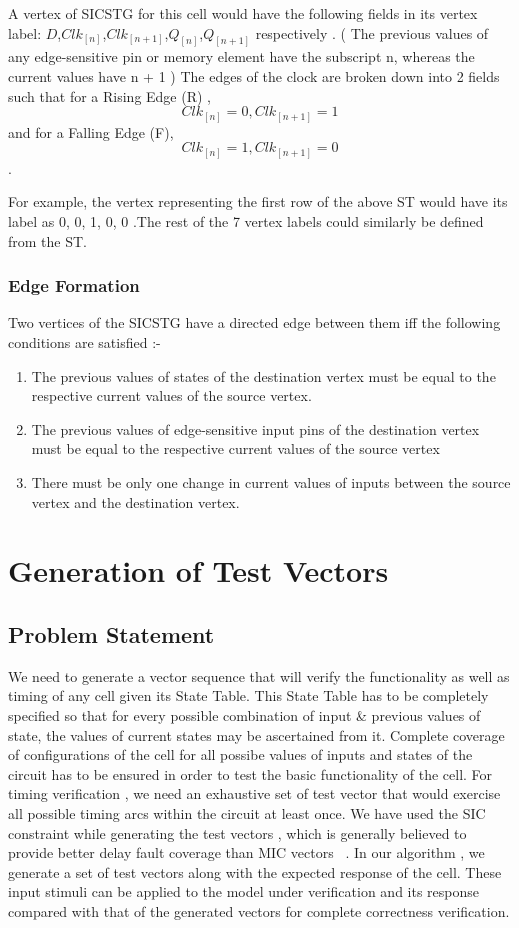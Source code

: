\documentclass[final]{ieee}
\begin{document}
A vertex of SICSTG for this cell would have the following fields in its vertex label: $D$,$Clk_{[n] }$,$Clk_{[n+1]}$,$Q_{[n]}$,$Q_{[n+1]}$ respectively . ( The previous values of any edge-sensitive pin or memory element have the subscript n, whereas the current values have n + 1 ) The edges of the clock are broken down into 2 fields such that for a Rising Edge (R) , \[ Clk_{[n]} = 0 , Clk_{[n+1]} = 1 \] and for a Falling Edge (F), \[ Clk_{[n]} = 1 , Clk_{[n+1]} = 0 \].

For example, the vertex representing the first row of the above ST would have its label as 0, 0, 1, 0, 0 .The rest of the 7 vertex labels could similarly be defined from the ST.

\subsubsection{Edge Formation}
\label{edge_defn}
Two vertices of the SICSTG have a directed edge between them iff the following conditions are satisfied :-
\begin{enumerate}
 \item The previous values of states of the destination vertex must be equal to the respective current values of the source vertex.
 \item The previous values of edge-sensitive input pins of the destination vertex must be equal to the respective current values of the source vertex
 \item There must be only one change in current values of inputs between the source vertex and the destination vertex.
\end{enumerate}

\section{Generation of Test Vectors}
\subsection{Problem Statement}
We need to generate a vector sequence that will verify the functionality as well as timing of any cell given its State Table. This State Table has to be completely specified so that for every possible combination of input \& previous values of state, the values of current states may be ascertained from it. Complete coverage of configurations of the cell for all possibe values of inputs and states of the circuit has to be ensured in order to test the basic functionality of the cell. For timing verification , we need an exhaustive set of test vector that would exercise all possible timing arcs within the circuit at least once. We have used the SIC constraint while generating the test vectors , which is generally believed to provide better delay fault coverage than MIC vectors ~\cite{rsic}. In our algorithm , we generate a set of test vectors along with the expected response of the cell. These input stimuli can be applied to the model under verification and its response compared with that of the generated vectors for complete correctness verification.
\end{document}
